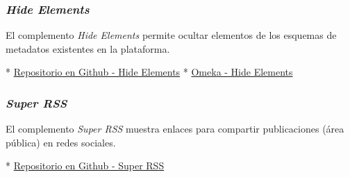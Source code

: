 \documentclass[
]{article}
\begin{document}
\hypertarget{hide-elements}{%
\subsubsection{\texorpdfstring{\emph{Hide
Elements}}{Hide Elements}}\label{hide-elements}}

El complemento \emph{Hide Elements} permite ocultar elementos de los
esquemas de metadatos existentes en la plataforma.

* \href{https://github.com/zerocrates/HideElements}{Repositorio en
Github - Hide Elements} *
\href{https://omeka.org/classic/plugins/HideElements/}{Omeka - Hide
Elements}

\hypertarget{super-rss}{%
\subsubsection{\texorpdfstring{\emph{Super
RSS}}{Super RSS}}\label{super-rss}}

El complemento \emph{Super RSS} muestra enlaces para compartir
publicaciones (área pública) en redes sociales.

* \href{https://github.com/CPHDH/SuperRss}{Repositorio en Github - Super
RSS}
\end{document}
